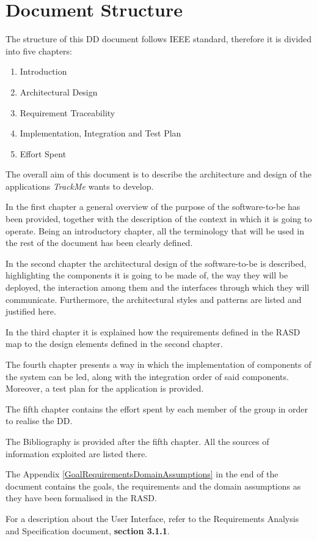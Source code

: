 \section{Document Structure}
    The structure of this DD document follows IEEE standard, therefore it is divided into five chapters:
    \begin{enumerate}
        \item Introduction
        
        \item Architectural Design
        
        \item Requirement Traceability
        
        \item Implementation, Integration and Test Plan
        
        \item Effort Spent
    \end{enumerate}
    
The overall aim of this document is to describe the architecture and design of the applications \emph{TrackMe} wants to develop.
    
    In the first chapter a general overview of the purpose of the software-to-be has been provided, together with the description of the context in which it is going to operate. Being an introductory chapter, all the terminology that will be used in the rest of the document has been clearly defined.
    
    In the second chapter the architectural design of the software-to-be is described, highlighting the components it is going to be made of, the way they will be deployed, the interaction among them and the interfaces through which they will communicate. Furthermore, the architectural styles and patterns are listed and justified here.
    
    In the third chapter it is explained how the requirements defined in the RASD map to the design elements defined in the second chapter.
    
    The fourth chapter presents a way in which the implementation of components of the system can be led, along with the integration order of said components. Moreover, a test plan for the application is provided.
    
    The fifth chapter contains the effort spent by each member of the group in order to realise the DD.
    
    The Bibliography is provided after the fifth chapter. All the sources of information exploited are listed there.
    
    The Appendix \ref{GoalRequirementsDomainAssumptions} in the end of the document contains the goals, the requirements and the domain assumptions as they have been formalised in the RASD.
    
    For a description about the User Interface, refer to the Requirements Analysis and Specification document, \textbf{section 3.1.1}.
    
    
